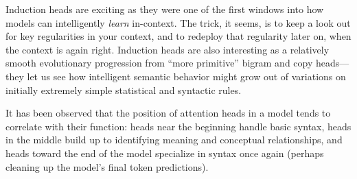 Induction heads are exciting as they were one of the first windows into how
models can intelligently \emph{learn} in-context. The trick, it seems, is to
keep a look out for key regularities in your context, and to redeploy that
regularity later on, when the context is again right. Induction heads are also
interesting as a relatively smooth evolutionary progression from ``more
primitive'' bigram and copy heads---they let us see how intelligent semantic
behavior might grow out of variations on initially extremely simple statistical
and syntactic rules.

It has been observed that the position of attention heads in a model tends to
correlate with their function: heads near the beginning handle basic syntax,
heads in the middle build up to identifying meaning and conceptual
relationships, and heads toward the end of the model specialize in syntax once
again (perhaps cleaning up the model's final token predictions).




